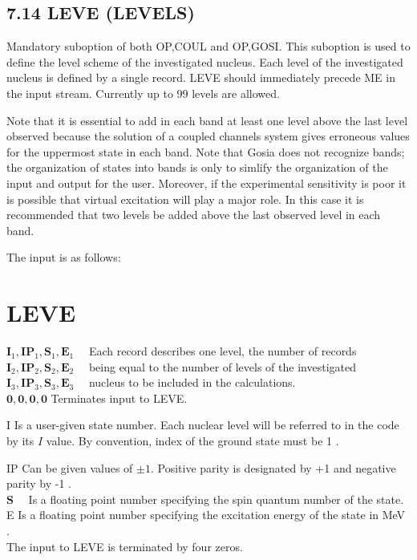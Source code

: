\documentclass[10pt]{article}
\begin{document}
\subsection*{7.14 LEVE (LEVELS)}
Mandatory suboption of both OP,COUL and OP,GOSI. This suboption is used to define the level scheme of the investigated nucleus. Each level of the investigated nucleus is defined by a single record. LEVE should immediately precede ME in the input stream. Currently up to 99 levels are allowed.

Note that it is essential to add in each band at least one level above the last level observed because the solution of a coupled channels system gives erroneous values for the uppermost state in each band. Note that Gosia does not recognize bands; the organization of states into bands is only to simlify the organization of the input and output for the user. Moreover, if the experimental sensitivity is poor it is possible that virtual excitation will play a major role. In this case it is recommended that two levels be added above the last observed level in each band.

The input is as follows:

\section*{LEVE}
$\mathbf{I}_{1}, \mathbf{I P}_{1}, \mathbf{S}_{1}, \mathbf{E}_{1} \quad$ Each record describes one level, the number of records\\
$\mathbf{I}_{2}, \mathbf{I} \mathbf{P}_{2}, \mathbf{S}_{2}, \mathbf{E}_{2} \quad$ being equal to the number of levels of the investigated\\
$\mathbf{I}_{3}, \mathbf{I P}_{3}, \mathbf{S}_{3}, \mathbf{E}_{3} \quad$ nucleus to be included in the calculations.\\
$\mathbf{0}, \mathbf{0}, \mathbf{0}, \mathbf{0}$ Terminates input to LEVE.

I Is a user-given state number. Each nuclear level will be referred to in the code by its $I$ value. By convention, index of the ground state must be 1 .

IP Can be given values of $\pm 1$. Positive parity is designated by +1 and negative parity by -1 .\\
$\mathbf{S} \quad$ Is a floating point number specifying the spin quantum number of the state.\\
E Is a floating point number specifying the excitation energy of the state in MeV .\\
The input to LEVE is terminated by four zeros.
\end{document}
